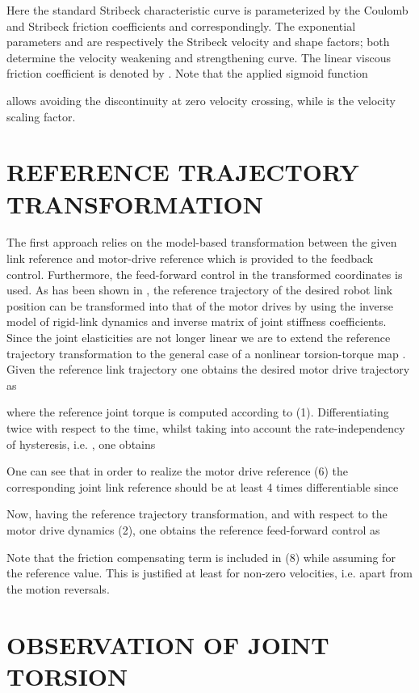 \documentclass[a4paper, 10pt, conference]{ieeeconf}
\begin{document}
Here the standard Stribeck characteristic curve is parameterized
by the Coulomb and Stribeck friction coefficients  and
 correspondingly. The exponential parameters  and  are respectively the Stribeck velocity and shape
factors; both determine the velocity weakening and strengthening
curve. The linear viscous friction coefficient is denoted by .
Note that the applied sigmoid function

allows avoiding the discontinuity at zero velocity crossing, while
 is the velocity scaling factor.




\section{REFERENCE TRAJECTORY TRANSFORMATION}
\label{sec:3}

The first approach relies on the model-based transformation
between the given link reference  and motor-drive reference
 which is provided to the feedback control.
Furthermore, the feed-forward control in the transformed  coordinates is used. As has been shown in \cite{DeLuca00},
the reference trajectory of the desired robot link position can be
transformed into that of the motor drives by using the inverse
model of rigid-link dynamics and inverse matrix of joint stiffness
coefficients. Since the joint elasticities are not longer linear
we are to extend the reference trajectory transformation to the
general case of a nonlinear torsion-torque map . Given the reference link trajectory  one obtains the desired motor drive trajectory as

where the reference joint torque  is computed according
to (1). Differentiating twice with respect to the time, whilst
taking into account the rate-independency of hysteresis, i.e.
, one obtains

One can see that in order to realize the motor drive reference (6)
the corresponding joint link reference should be at least 4 times
differentiable since

Now, having the reference trajectory transformation, and with
respect to the motor drive dynamics (2), one obtains the reference
feed-forward control as

Note that the friction compensating term is included in (8) while
assuming  for the reference
value. This is justified at least for non-zero velocities, i.e.
apart from the motion reversals.


\section{OBSERVATION OF JOINT TORSION}
\label{sec:4}
\end{document}
